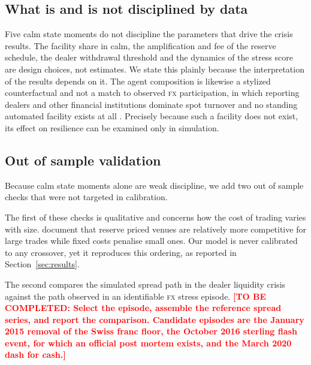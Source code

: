 \documentclass[a4paper,fleqn]{cas-sc}
\newcommand{\acro}[1]{\textsc{\MakeLowercase{#1}}\xspace}
\newcommand{\FX}{\acro{FX}}
\newcommand{\TODO}[1]{\textcolor{red}{\textbf{[TO BE COMPLETED: #1]}}}
\begin{document}
\subsection{What is and is not disciplined by data}

Five calm state moments do not discipline the parameters that drive the crisis results. The facility share in calm, the amplification and fee of the reserve schedule, the dealer withdrawal threshold and the dynamics of the stress score are design choices, not estimates. We state this plainly because the interpretation of the results depends on it. The agent composition is likewise a stylized counterfactual and not a match to observed \FX{} participation, in which reporting dealers and other financial institutions dominate spot turnover and no standing automated facility exists at all \citep{bis2025}. Precisely because such a facility does not exist, its effect on resilience can be examined only in simulation.

\subsection{Out of sample validation}

Because calm state moments alone are weak discipline, we add two out of sample checks that were not targeted in calibration.

The first of these checks is qualitative and concerns how the cost of trading varies with size. \citet{barbon2023} document that reserve priced venues are relatively more competitive for large trades while fixed costs penalise small ones. Our model is never calibrated to any crossover, yet it reproduces this ordering, as reported in Section~\ref{sec:results}.

The second compares the simulated spread path in the dealer liquidity crisis against the path observed in an identifiable \FX{} stress episode. \TODO{Select the episode, assemble the reference spread series, and report the comparison. Candidate episodes are the January 2015 removal of the Swiss franc floor, the October 2016 sterling flash event, for which an official post mortem exists, and the March 2020 dash for cash.}
\end{document}
